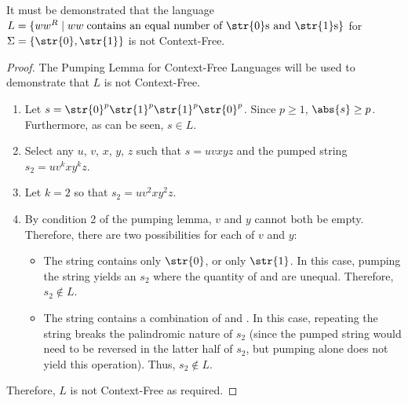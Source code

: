 It must be demonstrated that the language $L = \{ ww^R \mid ww \; \text{contains an equal number of \str{0}s and \str{1}s}\}$ for $\Sigma = \{\str{0}, \str{1}\}$ is not Context-Free.

\begin{proof}
	The Pumping Lemma for Context-Free Languages will be used to demonstrate that $L$ is not Context-Free.
	\begin{enumerate}[label=\Roman*.]
		\item Let $s = \str{0}^p\str{1}^p\str{1}^p\str{0}^p$. Since $p \geq 1$, $\abs{s} \geq p$. Furthermore, as can be seen, $s \in L$.
		\item Select any $u$, $v$, $x$, $y$, $z$ such that $s = uvxyz$ and the pumped string $s_2 = uv^kxy^kz$.
		\item Let $k = 2$ so that $s_2 = uv^2xy^2z$.
		\item By condition 2 of the pumping lemma, $v$ and $y$ cannot both be empty. Therefore, there are two possibilities for each of $v$ and $y$:
		\begin{itemize}
			\item The string contains only $\str{0}$, or only $\str{1}$. In this case, pumping the string yields an $s_2$ where the quantity of  and  are unequal. Therefore, $s_2 \notin L$.
			\item The string contains a combination of  and . In this case, repeating the string breaks the palindromic nature of $s_2$ (since the pumped string would need to be reversed in the latter half of $s_2$, but pumping alone does not yield this operation). Thus, $s_2 \notin L$.
		\end{itemize}
	\end{enumerate}
	Therefore, $L$ is not Context-Free as required.
\end{proof}